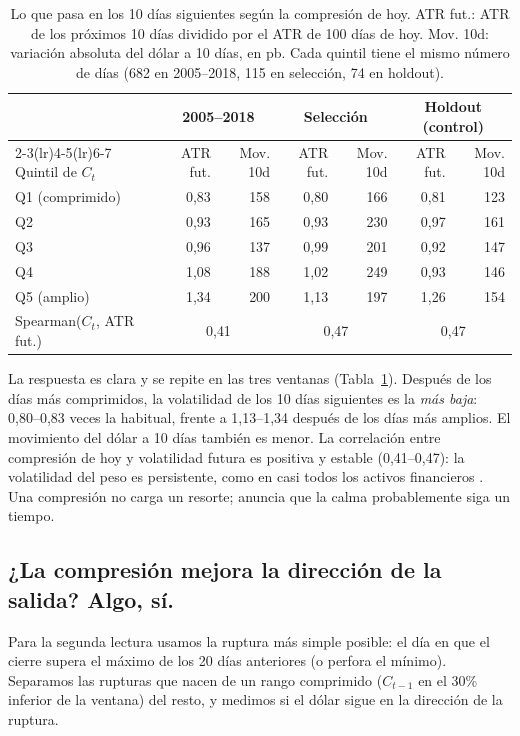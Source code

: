 \documentclass[10pt,a4paper]{article}
\begin{document}
\begin{table}[htbp]\centering\small
\begin{tabular}{@{}lrrrrrr@{}}
\toprule
& \multicolumn{2}{c}{2005--2018} & \multicolumn{2}{c}{Selección} & \multicolumn{2}{c}{Holdout (control)} \\
\cmidrule(lr){2-3}\cmidrule(lr){4-5}\cmidrule(lr){6-7}
Quintil de $C_t$ & ATR fut. & Mov. 10d & ATR fut. & Mov. 10d & ATR fut. & Mov. 10d \\
\midrule
Q1 (comprimido) & 0{,}83 & 158 & 0{,}80 & 166 & 0{,}81 & 123 \\
Q2              & 0{,}93 & 165 & 0{,}93 & 230 & 0{,}97 & 161 \\
Q3              & 0{,}96 & 137 & 0{,}99 & 201 & 0{,}92 & 147 \\
Q4              & 1{,}08 & 188 & 1{,}02 & 249 & 0{,}93 & 146 \\
Q5 (amplio)     & 1{,}34 & 200 & 1{,}13 & 197 & 1{,}26 & 154 \\
\midrule
Spearman($C_t$, ATR fut.) & \multicolumn{2}{c}{0{,}41} & \multicolumn{2}{c}{0{,}47} & \multicolumn{2}{c}{0{,}47} \\
\bottomrule
\end{tabular}
\caption{Lo que pasa en los 10 días siguientes según la compresión de hoy. ATR fut.:
ATR de los próximos 10 días dividido por el ATR de 100 días de hoy. Mov. 10d:
variación absoluta del dólar a 10 días, en pb. Cada quintil tiene el mismo número
de días (682 en 2005--2018, 115 en selección, 74 en holdout).}\label{tab:comp_mag}
\end{table}

La respuesta es clara y se repite en las tres ventanas (Tabla~\ref{tab:comp_mag}).
Después de los días más comprimidos, la volatilidad de los 10 días siguientes es
la \emph{más baja}: 0,80--0,83 veces la habitual, frente a 1,13--1,34 después de los
días más amplios. El movimiento del dólar a 10 días también es menor. La
correlación entre compresión de hoy y volatilidad futura es positiva y estable
(0,41--0,47): la volatilidad del peso es persistente, como en casi todos los
activos financieros \citep{bollerslev1986}. Una compresión no carga un resorte;
anuncia que la calma probablemente siga un tiempo.

\subsection{¿La compresión mejora la dirección de la salida? Algo, sí.}

Para la segunda lectura usamos la ruptura más simple posible: el día en que el
cierre supera el máximo de los 20 días anteriores (o perfora el mínimo). Separamos
las rupturas que nacen de un rango comprimido ($C_{t-1}$ en el 30\% inferior de la
ventana) del resto, y medimos si el dólar sigue en la dirección de la ruptura.
\end{document}
